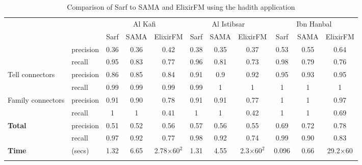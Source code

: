 \begin{table}[tb]
\centering
\begin{minipage}{.8\textwidth} 
\caption{\label{tab:exp1Res}Comparison of Sarf to SAMA and ElixirFM using the hadith application}
 {
  \begin{tabular}{p{1.3cm}lccccccccc}\toprule
    &       & \multicolumn{3}{c}{Al Kafi} & \multicolumn{3}{c}{Al Istibsar} & \multicolumn{3}{c}{Ibn Hanbal} \\[4pt]
          &       & Sarf  & SAMA  & ElixirFM & Sarf  & SAMA  & ElixirFM & Sarf  & SAMA  & ElixirFM \\ \colrule
    \multirow{2}{1.3cm}{Proper Names} & precision 
                                    & 0.36  & 0.36  & 0.42  & 0.38  & 0.35  & 0.37  & 0.53  & 0.55  & 0.64 \\[4pt]
    & recall 
       & 0.95  & 0.83  & 0.77  & 0.96  & 0.81  & 0.73  & 0.98  & 0.79  & 0.76 \\[6pt]
    \multirow{2}{1.3cm}{Tell connectors }
    & precision & 0.86  & 0.85  & 0.84  & 0.91   & 0.9   & 0.92  & 0.95  & 0.93  & 0.95 \\[4pt]
    & recall & 0.99  & 0.99  & 0.99  & 0.99  & 1     & 1     & 1  & 1     & 1 \\[6pt]
    \multirow{2}{1.3cm}{ Family connectors }
    & precision & 0.91  & 0.90  & 0.78  & 0.91   & 0.91  & 0.77  & 1   & 1   & 0.97 \\[4pt]
    & recall & 1     & 1     & 0.41  & 1  & 1  & 0.42  & 1  & 1  & 0.69 \\[6pt]
    \multicolumn{1}{l}{\multirow{2}[0]{*}{\bf Total}} & precision & 0.51  & 0.52  & 0.56  & 0.57  & 0.56  & 0.55  & 0.69  & 0.72  & 0.78 \\[4pt]
    \multicolumn{1}{c}{} & recall & 0.97  & 0.92  & 0.77  & 0.98  & 0.92  & 0.74  & 0.99  & 0.90   & 0.83 \\[6pt]
             {\bf Time}  & (secs)      & 1.32  & 6.65  & 2.78$\times60^2$ & 1.31  & 4.55  & 2.3$\times60^2$ & 0.096 & 0.66  & 29.2$\times$60 \\[4pt]
    \botrule
    \end{tabular}
}
\end{minipage}
\end{table}%


